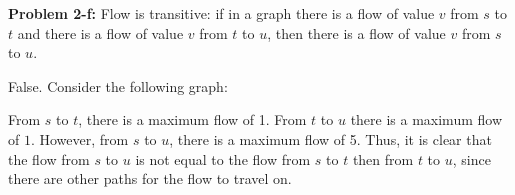 \documentclass[psamsfonts]{amsart}
\newenvironment{sol}{\vspace{0.25cm}{\large \bfseries Solution:}}{\qedsymbol}
\newenvironment{prob}[1]{\begin{framed}{\large \bfseries Problem #1:}}{\end{framed}}
\begin{document}
\begin{prob}{2-f}
Flow is transitive: if in a graph there is a flow of value $v$ from $s$ to $t$ and there is a flow of value $v$ from $t$ to $u$, then there is a flow of value $v$ from $s$ to $u$.
\end{prob}
\begin{sol}
False. Consider the following graph:
\begin{figure}[h!]
\centering
{}
\end{figure}

From $s$ to $t$, there is a maximum flow of 1. From $t$ to $u$ there is a maximum flow of $1$. However, from $s$ to $u$, there is a maximum flow of 5. Thus, it is clear that the flow from $s$ to $u$ is not equal to the flow from $s$ to $t$ then from $t$ to $u$, since there are other paths for the flow to travel on. 
\end{sol}
\end{document}
